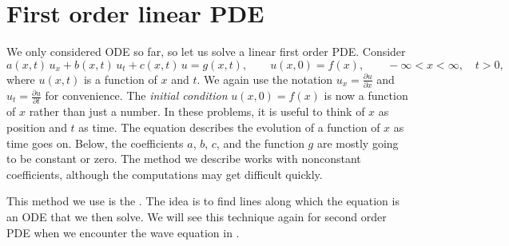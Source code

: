 \sectionnewpage
\section{First order linear PDE}
\label{fopde:section}


We only considered ODE so far, so let us solve a linear first order
PDE\@.  Consider
\begin{equation*}
a(x,t) \, u_x + b(x,t) \, u_t + c(x,t) \, u = g(x,t), \qquad u(x,0) = f(x) , \qquad -\infty < x < \infty,
\quad t > 0 ,
\end{equation*}
where $u(x,t)$ is a function of $x$ and $t$.
We again use the notation $u_x = \frac{\partial u}{\partial x}$ and
$u_t = \frac{\partial u}{\partial t}$ for convenience.
The \emph{initial condition}
$u(x,0) = f(x)$ is now a function of $x$ rather than just a number.
In these problems, it is useful to think of $x$ as position and $t$ as time.
The equation describes the evolution of a function of $x$ as
time goes on.
Below, the coefficients $a$, $b$, $c$, and the function $g$
are mostly going to be constant or zero.  
The method we describe works with nonconstant coefficients,
although the computations may get difficult quickly.

This method we use is the
\emph{}.
The idea is to find lines along which the equation is
an ODE that we then solve.
We will see this technique again for second order PDE
when we encounter the wave equation in .

